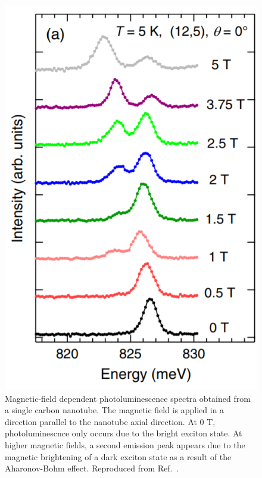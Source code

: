 \begin{figure}[ht]
	\centering
	\includegraphics[scale=0.5]{images/chapter_optical_props/dark_brightening_srivastava}
	\caption{Magnetic-field dependent photoluminescence spectra obtained from a single carbon nanotube. The magnetic field is applied in a direction parallel to the nanotube axial direction. At 0 T, photoluminescnce only occurs due to the bright exciton state. At higher magnetic fields, a second emission peak appears due to the magnetic brightening of a dark exciton state as a result of the Aharonov-Bohm effect.  Reproduced from Ref.\ \cite{srivastava2008direct}.}
	\label{fig:exciton_brightening}
\end{figure}


%

